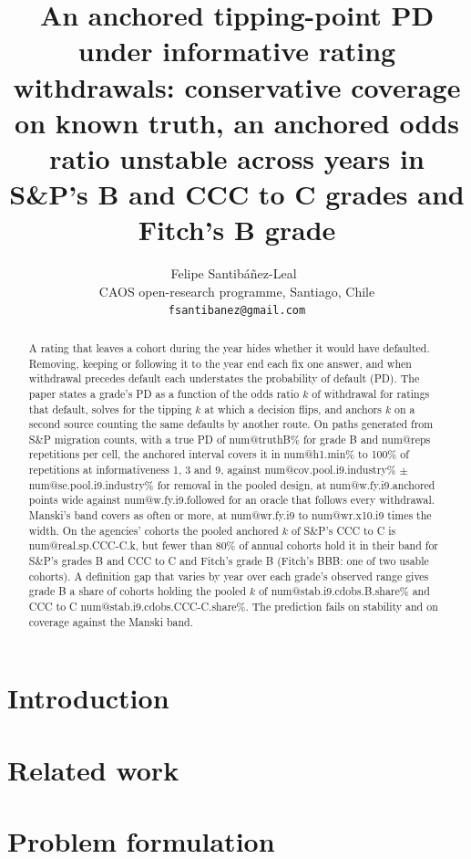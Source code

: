 \documentclass[11pt]{article}
\title{An anchored tipping-point PD under informative rating withdrawals: conservative coverage on known truth, an anchored odds ratio unstable across years in S\&P's B and CCC to C grades and Fitch's B grade}
\author{Felipe Santib\'a\~nez-Leal~\orcidlink{0000-0002-0150-3246}\\
\small CAOS open-research programme, Santiago, Chile\\
\small \texttt{fsantibanez@gmail.com}}
\date{\docdate}
\makeatletter
\newcommand{\nv}[1]{\csname num@#1\endcsname}
\makeatother
\begin{document}
\maketitle
\headerblock

\begin{abstract}
A rating that leaves a cohort during the year hides whether it would have defaulted. Removing, keeping or following it to the year end each fix one answer, and when withdrawal precedes default each understates the probability of default (PD).
The paper states a grade's PD as a function of the odds ratio $k$ of withdrawal for ratings that default, solves for the tipping $k$ at which a decision flips, and anchors $k$ on a second source counting the same defaults by another route.
On paths generated from S\&P migration counts, with a true PD of \nv{truthB}\% for grade B and \nv{reps} repetitions per cell, the anchored interval covers it in \nv{h1.min}\% to 100\% of repetitions at informativeness 1, 3 and 9, against \nv{cov.pool.i9.industry}\% $\pm$ \nv{se.pool.i9.industry}\% for removal in the pooled design, at \nv{w.fy.i9.anchored} points wide against \nv{w.fy.i9.followed} for an oracle that follows every withdrawal.
Manski's band covers as often or more, at \nv{wr.fy.i9} to \nv{wr.x10.i9} times the width.
On the agencies' cohorts the pooled anchored $k$ of S\&P's CCC to C is \nv{real.sp.CCC-C.k}, but fewer than 80\% of annual cohorts hold it in their band for S\&P's grades B and CCC to C and Fitch's grade B (Fitch's BBB: one of two usable cohorts). A definition gap that varies by year over each grade's observed range gives grade B a share of cohorts holding the pooled $k$ of \nv{stab.i9.cdobs.B.share}\% and CCC to C \nv{stab.i9.cdobs.CCC-C.share}\%. The prediction fails on stability and on coverage against the Manski band.
\end{abstract}

\section{Introduction}
\label{sec:introduction}


\section{Related work}
\label{sec:related-work}


\section{Problem formulation}
\label{sec:problem}

\end{document}
